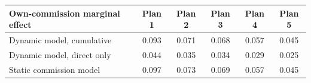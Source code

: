 \begin{tabular}{lccccc}
\hline\hline
Own-commission marginal effect & Plan 1 & Plan 2 & Plan 3 & Plan 4 & Plan 5 \\
\hline
Dynamic model, cumulative & 0.093 & 0.071 & 0.068 & 0.057 & 0.045 \\
Dynamic model, direct only & 0.044 & 0.035 & 0.034 & 0.029 & 0.025 \\
Static commission model & 0.097 & 0.073 & 0.069 & 0.057 & 0.045 \\
\hline\hline
\end{tabular}
